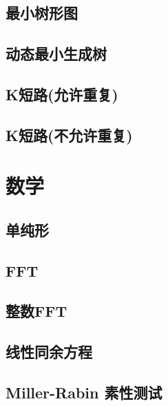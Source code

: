 \documentclass[10pt]{article}
\begin{document}
	\subsection{最小树形图}
		

	\subsection{动态最小生成树}
		

	\subsection{K短路(允许重复)}
		

	\subsection{K短路(不允许重复)}
		

\section{数学}
	\subsection{单纯形}
		
	
	\subsection{FFT}
		

	\subsection{整数FFT}
		

	\subsection{线性同余方程}
		

	\subsection{Miller-Rabin 素性测试}
		
\end{document}
